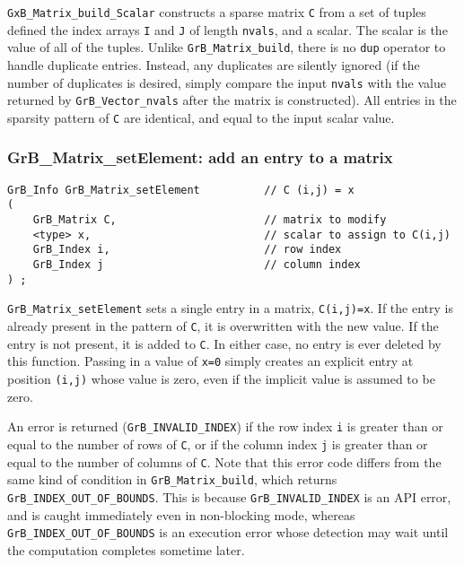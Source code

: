 \documentclass[12pt]{article}
\begin{document}
\verb'GxB_Matrix_build_Scalar' constructs a sparse matrix \verb'C' from a set
of tuples defined the index arrays \verb'I' and \verb'J' of length
\verb'nvals', and a scalar.  The scalar is the value of all of the tuples.
Unlike \verb'GrB_Matrix_build', there is no \verb'dup' operator to handle
duplicate entries.  Instead, any duplicates are silently ignored (if the number
of duplicates is desired, simply compare the input \verb'nvals' with the value
returned by \verb'GrB_Vector_nvals' after the matrix is constructed).  All
entries in the sparsity pattern of \verb'C' are identical, and equal to the
input scalar value.

\subsubsection{{\sf GrB\_Matrix\_setElement:}   add an entry to a matrix}
\label{matrix_setElement}

\begin{mdframed}[userdefinedwidth=6in]
{\footnotesize
\begin{verbatim}
GrB_Info GrB_Matrix_setElement          // C (i,j) = x
(
    GrB_Matrix C,                       // matrix to modify
    <type> x,                           // scalar to assign to C(i,j)
    GrB_Index i,                        // row index
    GrB_Index j                         // column index
) ;
\end{verbatim} } \end{mdframed}

\verb'GrB_Matrix_setElement' sets a single entry in a matrix, \verb'C(i,j)=x'.
If the entry is already present in the pattern of \verb'C', it is overwritten
with the new value.  If the entry is not present, it is added to \verb'C'.  In
either case, no entry is ever deleted by this function.  Passing in a value of
\verb'x=0' simply creates an explicit entry at position \verb'(i,j)' whose
value is zero, even if the implicit value is assumed to be zero.

An error is returned (\verb'GrB_INVALID_INDEX') if the row index \verb'i' is
greater than or equal to the number of rows of \verb'C', or if the column index
\verb'j' is greater than or equal to the number of columns of \verb'C'.  Note
that this error code differs from the same kind of condition in
\verb'GrB_Matrix_build', which returns \verb'GrB_INDEX_OUT_OF_BOUNDS'.  This is
because \verb'GrB_INVALID_INDEX' is an API error, and is caught immediately
even in non-blocking mode, whereas \verb'GrB_INDEX_OUT_OF_BOUNDS' is an
execution error whose detection may wait until the computation completes
sometime later.
\end{document}
